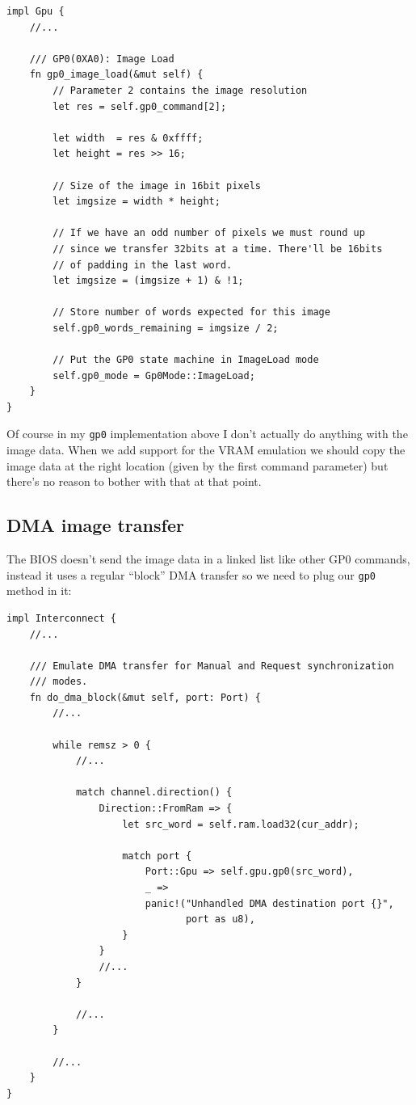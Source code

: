 \documentclass[a4paper]{article}
\newcommand{\code}[1] {\texttt{#1}}
\begin{document}
\begin{lstlisting}
impl Gpu {
    //...

    /// GP0(0XA0): Image Load
    fn gp0_image_load(&mut self) {
        // Parameter 2 contains the image resolution
        let res = self.gp0_command[2];

        let width  = res & 0xffff;
        let height = res >> 16;

        // Size of the image in 16bit pixels
        let imgsize = width * height;

        // If we have an odd number of pixels we must round up
        // since we transfer 32bits at a time. There'll be 16bits
        // of padding in the last word.
        let imgsize = (imgsize + 1) & !1;

        // Store number of words expected for this image
        self.gp0_words_remaining = imgsize / 2;

        // Put the GP0 state machine in ImageLoad mode
        self.gp0_mode = Gp0Mode::ImageLoad;
    }
}
\end{lstlisting}

Of course in my \code{gp0} implementation above I don't actually do
anything with the image data. When we add support for the VRAM
emulation we should copy the image data at the right location (given
by the first command parameter) but there's no reason to bother with
that at that point.

\subsection{DMA image transfer}

The BIOS doesn't send the image data in a linked list like other GP0
commands, instead it uses a regular ``block'' DMA transfer so we need
to plug our \code{gp0} method in it:

\begin{lstlisting}
impl Interconnect {
    //...

    /// Emulate DMA transfer for Manual and Request synchronization
    /// modes.
    fn do_dma_block(&mut self, port: Port) {
        //...

        while remsz > 0 {
            //...

            match channel.direction() {
                Direction::FromRam => {
                    let src_word = self.ram.load32(cur_addr);

                    match port {
                        Port::Gpu => self.gpu.gp0(src_word),
                        _ =>
                        panic!("Unhandled DMA destination port {}",
                               port as u8),
                    }
                }
                //...
            }

            //...
        }

        //...
    }
}
\end{lstlisting}
\end{document}
